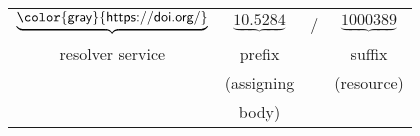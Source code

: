 \centering
\begin{tabular}{c@{\,}c@{\,}c@{\,}c}
\Large$\underbrace{\textsf{\color{gray}{https://doi.org/}}}$
& \Large$\underbrace{10\textsf{.}5284}$ 
& \Large / 
& \Large$\underbrace{1000389}$ \\
resolver service& prefix & & suffix \\
& (assigning & & (resource)\\
& body) & & \\
\end{tabular} 
